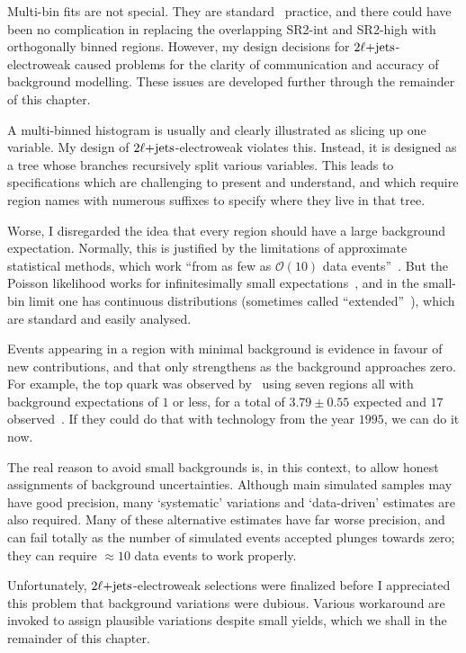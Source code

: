 Multi-bin fits are not special.
They are standard \atlas\ practice, and there could have been no complication
in replacing the overlapping SR2-int and SR2-high with orthogonally binned
regions.
However, my design decisions for $2\ell\mathrm{+jets}$-electroweak
caused problems for the clarity of communication and accuracy of background
modelling.
These issues are developed further through the remainder of this chapter.

A multi-binned histogram is usually and clearly illustrated as slicing up one
variable.
My design of $2\ell\mathrm{+jets}$-electroweak violates this.
Instead, it is designed as a tree whose branches recursively split various
variables.
This leads to specifications which are challenging to present and understand,
and which require region names with numerous suffixes to specify where they
live in that tree.

Worse, I disregarded the idea that every region should have a large
background expectation.
Normally, this is justified by the limitations of approximate statistical
methods, which work
``from as few as $\mathcal{O}(10)$ data events''~\cite{histfitter2014}.
But the Poisson likelihood works for infinitesimally small
expectations~\cite{skilling2009cosmology}, and in the small-bin limit one has
continuous distributions
(sometimes called ``extended''~\cite{barlow1990extended}),
which are standard and easily analysed.

Events appearing in a region with minimal background is evidence in favour
of new contributions, and that only strengthens as the background approaches
zero.
For example, the top quark was observed by \dzero\ using seven regions all with
background expectations of $1$ or less, for a total of $3.79\pm0.55$ expected
and $17$ observed~\cite{abachi1995observation}.
If they could do that with technology from the year $1995$, we can do it now.

The real reason to avoid small backgrounds is, in this context, to allow honest
assignments of background uncertainties.
Although main simulated samples may have good precision,
many `systematic' variations and `data-driven' estimates are also required.
Many of these alternative estimates have far worse precision, and can fail
totally as the number of simulated events accepted plunges towards zero;
they can require $\approx10$ data events to work properly.

Unfortunately, $2\ell\mathrm{+jets}$-electroweak selections were finalized before I
appreciated this problem that background variations were dubious.
Various workaround are invoked to assign plausible variations despite small
yields, which we shall in the remainder of this chapter.


